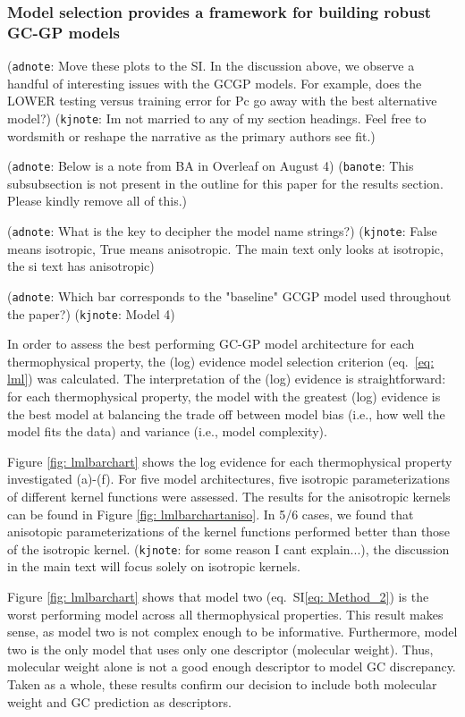 \documentclass[journal=jacsat,manuscript=article]{achemso}
\newcommand{\kjnote}[1]{{\color{Blue} (\texttt{kjnote}: #1)}}
\newcommand{\adnote}[1]{{\color{OliveGreen} (\texttt{adnote}: #1)}}
\newcommand{\banote}[1]{{\color{Salmon} (\texttt{banote}: #1)}}
\newcommand{\siref}[1]{SI\eqref{#1}}
\begin{document}
\subsubsection{Model selection provides a framework for building robust GC-GP models}
\adnote{Move these plots to the SI. In the discussion above, we observe a handful of interesting issues with the GCGP models. For example, does the LOWER testing versus training error for Pc go away with the best alternative model?}
\kjnote{Im not married to any of my section headings. Feel free to wordsmith or reshape the narrative as the primary authors see fit.}

\adnote{Below is a note from BA in Overleaf on August 4}
\banote{This subsubsection is not present in the outline for this paper for the results section. Please kindly remove all of this.}

\adnote{What is the key to decipher the model name strings?} \kjnote{False means isotropic, True means anisotropic. The main text only looks at isotropic, the si text has anisotropic}

\adnote{Which bar corresponds to the "baseline" GCGP model used throughout the paper?} \kjnote{Model 4}

In order to assess the best performing GC-GP model architecture for each thermophysical property, the (log) evidence model selection criterion (eq.~\eqref{eq: lml}) was calculated. The interpretation of the (log) evidence is straightforward: for each thermophysical property, the model with the greatest (log) evidence is the best model at balancing the trade off between model bias (i.e., how well the model fits the data) and variance (i.e., model complexity). 

Figure \ref{fig: lmlbarchart} shows the log evidence for each thermophysical property investigated (a)-(f). For five model architectures, five isotropic parameterizations of different kernel functions were assessed. The results for the anisotropic kernels can be found in Figure \ref{fig: lmlbarchartaniso}. In 5/6 cases, we found that anisotopic parameterizations of the kernel functions performed better than those of the isotropic kernel. \kjnote{for some reason I cant explain...}, the discussion in the main text will focus solely on isotropic kernels. 

Figure \ref{fig: lmlbarchart} shows that model two (eq.~\siref{eq: Method_2}) is the worst performing model across all thermophysical properties. This result makes sense, as model two is not complex enough to be informative. Furthermore, model two is the only model that uses only one descriptor (molecular weight). Thus, molecular weight alone is not a good enough descriptor to model GC discrepancy. Taken as a whole, these results confirm our decision to include both molecular weight and GC prediction as descriptors.
\end{document}
